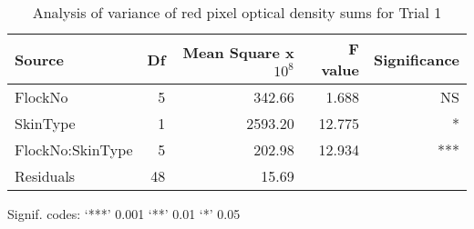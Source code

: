 \begin{table}[ht]
\centering
\captionsetup{width=0.0\textwidth}
\caption{Analysis of variance of red pixel optical density sums for Trial 1}
\label{tab:redpixelt1aov}
\begin{tabular}{lrrrr}
  \hline \rule{0pt}{12pt}
 Source & Df &  Mean Square x $10^8$ & F value & Significance \\ 
  \hline
FlockNo          & 5 &  342.66 & 1.688 & NS \\ 
  SkinType         & 1 & 2593.20 & 12.775 & * \\ 
  FlockNo:SkinType & 5 & 202.98 & 12.934 & *** \\ 
  Residuals        & 48 & 15.69 &  &  \\ 
   \hline
\end{tabular}
\begin{tabbing}
  Signif. codes: ‘***’ 0.001 ‘**’ 0.01 ‘*’ 0.05  \\
\end{tabbing}
\end{table}

